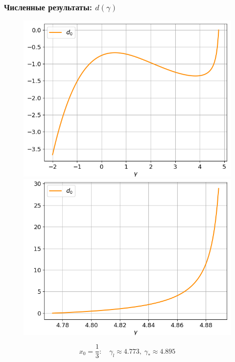 \documentclass[fullscreen=true, unicode, bookmarks=false]{beamer}
\begin{document}
\begin{frame}
\frametitle{ Численные результаты: $ d(\gamma) $ }

\begin{figure} 
\includegraphics[scale=0.37]{divergent_d0_before_13.png}  
\hfill
\includegraphics[scale=0.37]{divergent_d0_after_13.png}  
\end{figure}

$$ x_0 = \frac{1}{3}: \quad \gamma_l \approx 4.773, \; \gamma_* \approx 4.895 $$

\end{frame}
\end{document}
